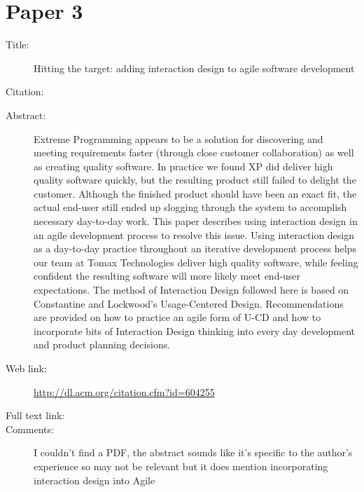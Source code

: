 \documentclass{scrartcl}
\begin{document}
\section*{Paper 3}
\begin{description}
\item[Title:] Hitting the target: adding interaction design to agile software development
\item[Citation:] \cite{Patton}
\item[Abstract:] Extreme Programming appears to be a solution for discovering and meeting requirements faster (through close customer collaboration) as well as creating quality software. In practice we found XP did deliver high quality software quickly, but the resulting product still failed to delight the customer. Although the finished product should have been an exact fit, the actual end-user still ended up slogging through the system to accomplish necessary day-to-day work. This paper describes using interaction design in an agile development process to resolve this issue. Using interaction design as a day-to-day practice throughout an iterative development process helps our team at Tomax Technologies deliver high quality software, while feeling confident the resulting software will more likely meet end-user expectations. The method of Interaction Design followed here is based on Constantine and Lockwood's Usage-Centered Design. Recommendations are provided on how to practice an agile form of U-CD and how to incorporate bits of Interaction Design thinking into every day development and product planning decisions.
\item[Web link:] \url{http://dl.acm.org/citation.cfm?id=604255}
\item[Full text link:]
\item[Comments:]  I couldn't find a PDF, the abstract sounds like it's specific to the author's experience so may not be relevant but it does mention incorporating interaction design into Agile 
\end{description}
\end{document}
